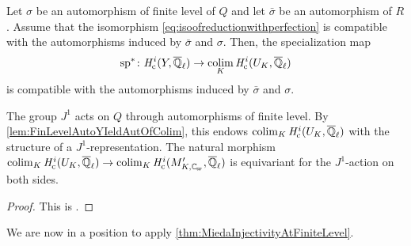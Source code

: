 \documentclass[../main.tex]{subfiles}
\begin{document}
\begin{prop}\label{prop:SpecMapIsEquivariantWithFinLev}
  Let $\sigma$ be an automorphism of finite level of $Q$ and let 
  $\bar \sigma$ be an automorphism of $R$. Assume that the isomorphism
  \eqref{eq:isoofreductionwithperfection} is compatible with the automorphisms
  induced by $\bar \sigma$ and $\sigma$. Then, the specialization map
  \begin{equation*}
    \mathrm{sp}^* \colon \mathit H_{\mathrm{c}}^i(Y, {\overline {\mathbb{Q}}_\ell}) \to \operatorname*{colim}_K \mathit H_{\mathrm{c}}^i(U_K, {\overline {\mathbb{Q}}_\ell})
  \end{equation*}
  is compatible with the automorphisms induced by $\bar \sigma$ and 
  $\sigma$. 
\end{prop}

\begin{prop}\label{prop:ActinOfJ1IsFinLevel}
  The group $J^1$ acts on $Q$ through automorphisms of finite level. 
  By \cref{lem:FinLevelAutoYIeldAutOfColim}, this endows $\operatorname*{colim}_K \mathit H_{\mathrm{c}}^i(U_K, {\overline {\mathbb{Q}}_\ell})$
  with the structure of a $J^1$-representation. The natural morphism $\colim_K
  \hHc^i(U_K, \Qlbar) \to \colim_K \hHc^i(M'_{K,\Cp}, \Qlbar)$ is equivariant
  for the $J^1$-action on both sides.
\begin{proof}
  This is \cite[Propsition 4.5]{mieda2016geometric}.
\end{proof}
\end{prop}

We are now in a position to apply \cref{thm:MiedaInjectivityAtFiniteLevel}.
\end{document}
